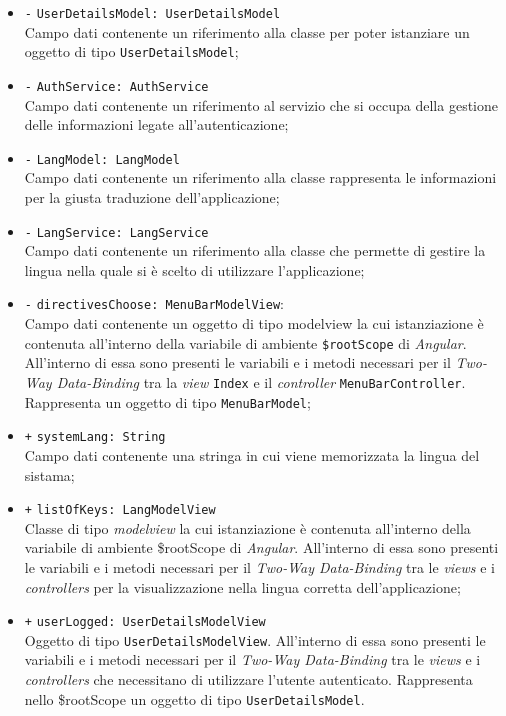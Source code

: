 \begin{itemize}
\begin{itemize}
		\item \texttt{-} \texttt{UserDetailsModel: UserDetailsModel} \\
		Campo dati contenente un riferimento alla classe per poter istanziare un oggetto di tipo \texttt{UserDetailsModel};
		\item \texttt{-} \texttt{AuthService: AuthService} \\
		Campo dati contenente un riferimento al servizio che si occupa della gestione delle informazioni legate all’autenticazione;
		\item \texttt{-} \texttt{LangModel: LangModel} \\
		Campo dati contenente un riferimento alla classe rappresenta le informazioni per la giusta traduzione dell'applicazione;
		\item \texttt{-} \texttt{LangService: LangService} \\
		Campo dati contenente un riferimento alla classe che permette di gestire la lingua nella quale si è scelto di utilizzare l'applicazione;
		\item \texttt{-} \texttt{directivesChoose: MenuBarModelView}: \\
		Campo dati contenente un oggetto di tipo modelview la cui istanziazione è contenuta all'interno della variabile di ambiente \texttt{\$rootScope} di \textit{Angular}. All'interno di essa sono presenti le variabili e i metodi necessari per il \textit{Two-Way Data-Binding} tra la \textit{view} \texttt{Index} e il \textit{controller} \texttt{MenuBarController}. Rappresenta un oggetto di tipo \texttt{MenuBarModel};
		\item \texttt{+} \texttt{systemLang: String} \\
		Campo dati contenente una stringa in cui viene memorizzata la lingua del sistama;
		\item \texttt{+} \texttt{listOfKeys: LangModelView}\\ 
		Classe di tipo \textit{modelview} la cui istanziazione è contenuta all'interno della variabile di ambiente \$rootScope di \textit{Angular}. All'interno di essa sono presenti le variabili e i metodi necessari per il \textit{Two-Way Data-Binding} tra le \textit{views} e i \textit{controllers} per la visualizzazione nella lingua corretta dell'applicazione;
		\item \texttt{+} \texttt{userLogged: UserDetailsModelView} \\
		Oggetto di tipo \texttt{UserDetailsModelView}. All'interno di essa sono presenti le variabili e i metodi necessari per il \textit{Two-Way Data-Binding} tra le \textit{views} e i \textit{controllers} che necessitano di utilizzare l'utente autenticato. Rappresenta nello \$rootScope un oggetto di tipo \texttt{UserDetailsModel}.

\end{itemize}
\end{itemize}
